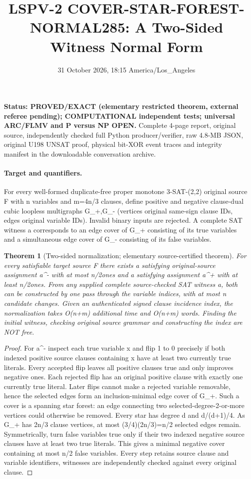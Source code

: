 \documentclass[10pt]{article}
\title{LSPV-2 COVER-STAR-FOREST-NORMAL285: A Two-Sided Witness Normal Form}
\date{31 October 2026, 18:15 America/Los_Angeles}
\newtheorem{theorem}{Theorem}
\begin{document}
\maketitle
\noindent\textbf{Status: PROVED/EXACT (elementary restricted theorem, external referee pending); COMPUTATIONAL independent tests; universal ARC/FLMV and P versus NP OPEN.} Complete 4-page report, original source, independently checked full Python producer/verifier, raw 4.8-MB JSON, original U198 UNSAT proof, physical bit-XOR event traces and integrity manifest in the downloadable conversation archive.
\paragraph{Target and quantifiers.}
For every well-formed duplicate-free proper monotone 3-SAT-(2,2) original source F with n variables and m=4n/3 clauses, define positive and negative clause-dual cubic loopless multigraphs G_+,G_- (vertices original same-sign clause IDs, edges original variable IDs). Invalid binary inputs are rejected. A complete SAT witness a corresponds to an edge cover of G_+ consisting of its true variables and a simultaneous edge cover of G_- consisting of its false variables.
\begin{theorem}[Two-sided normalization; elementary source-certified theorem]
For every satisfiable target source F there exists a satisfying original-source assignment a^- with at most \lfloor n/2\rfloor ones and a satisfying assignment a^+ with at least \lceil n/2\rceil ones. From any supplied complete source-checked SAT witness a, both can be constructed by one pass through the variable indices, with at most n candidate changes. Given an authenticated signed clause incidence index, the normalization takes O(n+m) additional time and O(n+m) words. Finding the initial witness, checking original source grammar and constructing the index are NOT free.
\end{theorem}
\begin{proof}
For a^- inspect each true variable x and flip 1 to 0 precisely if both indexed positive source clauses containing x have at least two currently true literals. Every accepted flip leaves all positive clauses true and only improves negative ones. Each rejected flip has an original positive clause with exactly one currently true literal. Later flips cannot make a rejected variable removable, hence the selected edges form an inclusion-minimal edge cover of G_+. Such a cover is a spanning star forest: an edge connecting two selected-degree-2-or-more vertices could otherwise be removed. Every star has degree d and d/(d+1)/4. As G_+ has 2n/3 clause vertices, at most (3/4)(2n/3)=n/2 selected edges remain. Symmetrically, turn false variables true only if their two indexed negative source clauses have at least two true literals. This gives a minimal negative cover containing at most n/2 false variables. Every step retains source clause and variable identifiers, witnesses are independently checked against every original clause.
\end{proof}
\end{document}
